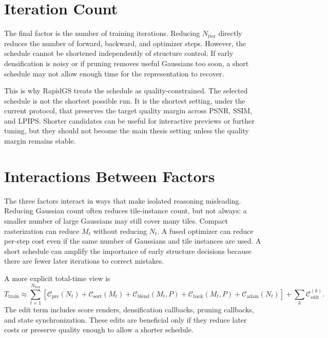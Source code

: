 \section{Iteration Count}

The final factor is the number of training iterations. Reducing $N_{\mathrm{iter}}$ directly reduces the number of forward, backward, and optimizer steps. However, the schedule cannot be shortened independently of structure control. If early densification is noisy or if pruning removes useful Gaussians too soon, a short schedule may not allow enough time for the representation to recover.

This is why RapidGS treats the schedule as quality-constrained. The selected schedule is not the shortest possible run. It is the shortest setting, under the current protocol, that preserves the target quality margin across PSNR, SSIM, and LPIPS. Shorter candidates can be useful for interactive previews or further tuning, but they should not become the main thesis setting unless the quality margin remains stable.

\section{Interactions Between Factors}

The three factors interact in ways that make isolated reasoning misleading. Reducing Gaussian count often reduces tile-instance count, but not always: a smaller number of large Gaussians may still cover many tiles. Compact rasterization can reduce $M_t$ without reducing $N_t$. A fused optimizer can reduce per-step cost even if the same number of Gaussians and tile instances are used. A short schedule can amplify the importance of early structure decisions because there are fewer later iterations to correct mistakes.

A more explicit total-time view is
\begin{equation}
T_{\mathrm{train}}
\approx
\sum_{t=1}^{N_{\mathrm{iter}}}
\left[
\mathcal{C}_{\mathrm{pre}}(N_t)
+
\mathcal{C}_{\mathrm{sort}}(M_t)
+
\mathcal{C}_{\mathrm{blend}}(M_t,P)
+
\mathcal{C}_{\mathrm{back}}(M_t,P)
+
\mathcal{C}_{\mathrm{adam}}(N_t)
\right]
+
\sum_k \mathcal{C}_{\mathrm{edit}}^{(k)} .
\end{equation}
The edit term includes score renders, densification callbacks, pruning callbacks, and state synchronization. These edits are beneficial only if they reduce later costs or preserve quality enough to allow a shorter schedule.

